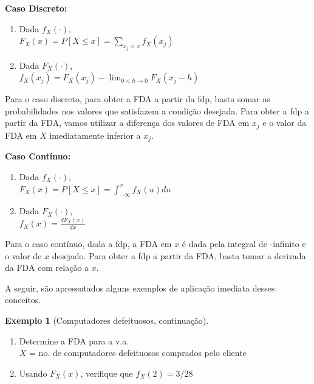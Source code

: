 \documentclass[
]{book}
\theoremstyle{definition}
\theoremstyle{definition}
\newtheorem{example}{Exemplo}[chapter]
\theoremstyle{definition}
\theoremstyle{remark}
\begin{document}
\textbf{Caso Discreto:}

\begin{enumerate}
\def\labelenumi{\roman{enumi}.}
\item
  Dada \({f_X(\cdot)}\),\\
  \({F_X(x) = P[X \leq x] = \sum_{x_j <x}f_X(x_j)}\)
\item
  Dada \({F_X(\cdot)}\),\\
  \({f_X(x_j) = F_X(x_j) - \lim_{0<h \rightarrow 0} F_X(x_j - h)}\)
\end{enumerate}

Para o caso discreto, para obter a FDA a partir da fdp, basta somar as probabilidades nos valores que satisfazem a condição desejada. Para obter a fdp a partir da FDA, vamos utilizar a diferença dos valores de FDA em \(x_j\) e o valor da FDA em \(X\) imediatamente inferior a \(x_j\).

\textbf{Caso Contínuo:}

\begin{enumerate}
\def\labelenumi{\roman{enumi}.}
\item
  Dada \({f_X(\cdot)}\),\\
  \({F_X(x) = P[X \leq x] = \int_{-\infty}^{x} f_X(u) du}\)
\item
  Dada \({F_X(\cdot)}\),\\
  \({f_X(x) = \frac{dF_X(x)}{dx}}\)
\end{enumerate}

Para o caso contínuo, dada a fdp, a FDA em \(x\) é dada pela integral de -infinito e o valor de \(x\) desejado. Para obter a fdp a partir da FDA, basta tomar a derivada da FDA com relação a \(x\).

A seguir, são apresentados alguns exemplos de aplicação imediata desses conceitos.

\begin{example}[Computadores defeituosos, continuação]
\protect\hypertarget{exm:unnamed-chunk-11}{}{\label{exm:unnamed-chunk-11} {} }
\end{example}

\begin{enumerate}
\def\labelenumi{\alph{enumi}.}
\item
  Determine a FDA para a v.a.\\
  \(X\) = no. de computadores defeituosos comprados pelo cliente
\item
  Usando \(F_X(x)\), verifique que \(f_X(2) = 3/28\)
\end{enumerate}
\end{document}

